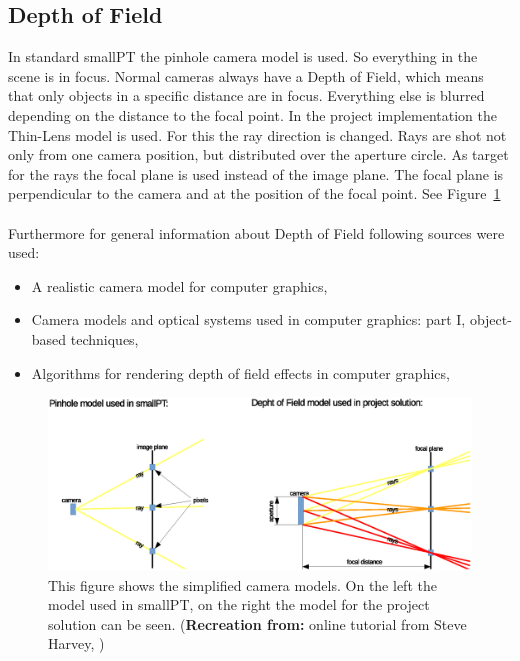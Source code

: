 \documentclass[11pt,a4paper]{article}
\begin{document}
\subsection{Depth of Field}
In standard smallPT the pinhole camera model is used. So everything in the scene is in focus. Normal cameras always have a Depth of Field, which means that only objects in a specific distance are in focus. Everything else is blurred depending on the distance to the focal point. In the project implementation the Thin-Lens model is used. For this the ray direction is changed. Rays are shot not only from one camera position, but distributed over the aperture circle. As target for the rays the focal plane is used instead of the image plane. The focal plane is perpendicular to the camera and at the position of the focal point. See Figure~\ref{fig:1}
\\
\\
Furthermore for general information about Depth of Field following sources were used:
\begin{itemize}
\item
A realistic camera model for computer graphics, \cite{kolb1995realistic}
\item
Camera models and optical systems used in computer graphics: part I, object-based techniques, \cite{barsky2003camera}
\item
Algorithms for rendering depth of field effects in computer graphics, \cite{barsky2008algorithms}

\end{itemize}

\begin{figure}[h]
\begin{center}
\includegraphics[trim=40 30 60 60, clip=true, scale=0.6]{images/pinholeVsDepthOfField}
\caption[Pinhole implementation vs Thin Lens implementation]{This figure shows the simplified camera models. On the left the model used in smallPT, on the right the model for the project solution can be seen. (\textbf{Recreation from:} online tutorial from Steve Harvey, \cite{link:Harvey})}
\label{fig:1}
\end{center}
\end{figure}
\end{document}
